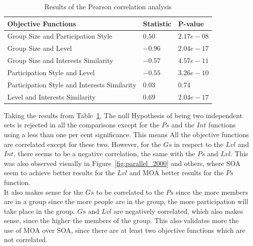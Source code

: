 \par
\begin{table}[H]
\centering

\begin{tabular}{lll}
\hline
Objective Functions & Statistic & P-value \\
\hline
Group Size and Participation Style & $0.50$ & $2.17e-08$ \\
Group Size and Level & $-0.96$ & $2.04e-17$ \\
Group Size and Interests Similarity & $-0.57$ & $4.57e-11$ \\
Participation Style and Level & $-0.55$ & $3.26e-10$ \\
Participation Style and Interests Similarity & $0.03$ & $0.74$ \\
Level and Interests Similarity & $0.69$ & $2.04e-17$ \\
\hline
\end{tabular}%

\caption{Results of the Pearson correlation analysis}
\label{tab:correlation}
\end{table}

Taking the results from Table~\ref{tab:correlation}, The null Hypothesis of being two independent sets is rejected in all the comparisons except for the $Ps$ and the $Int$ functions using a less than one per cent significance. This means All the objective functions are correlated except for these two. However, for the $Gs$ in respect to the $Lvl$ and $Int$, there seems to be a negative correlation, the same with the $Ps$ and $Lvl$. This was also observed visually in Figure~\ref{fig:parallel_2000} and others, where SOA seem to achieve better results for the $Lvl$ and MOA better results for the $Ps$ function.\\

It also makes sense for the $Gs$  to be correlated to the $Ps$ since the more members are in a group since the more people are in the group, the more participation will take place in the group. $Gs$ and $Lvl$ are negatively correlated, which also makes sense, since the higher the members of the group.
This also validates more the use of MOA over SOA, since there are at least two objective functions which are not correlated.